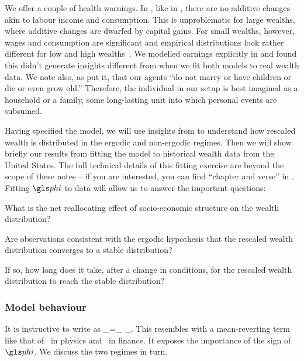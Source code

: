 We offer a couple of health warnings. In \RGBM, like in \GBM, there are no additive changes akin to labour income and consumption. This is unproblematic for large wealths, where additive changes are dwarfed by capital gains. For small wealths, however, wages and consumption are significant and empirical distributions look rather different for low and high wealths~\cite{DragulescuYakovenko2001}. We modelled earnings explicitly in \cite{BermanPetersAdamou2017} and found this didn't generate insights different from \RGBM when we fit both models to real wealth data. We note also, as \cite[p.~41]{meade1964efficiency} put it, that our agents ``do not marry or have children or die or even grow old.'' Therefore, the individual in our setup is best imagined as a household or a family, \ie some long-lasting unit into which personal events are subsumed.

Having specified the model, we will use insights from  to understand how rescaled wealth is distributed in the ergodic and non-ergodic regimes. Then we will show briefly our results from fitting the model to historical wealth data from the United States. The full technical details of this fitting exercise are beyond the scope of these notes -- if you are interested, you can find ``chapter and verse'' in \cite{BermanPetersAdamou2017}. Fitting $\gphi$ to data will allow us to answer the important questions:
\bi
\item
What is the net reallocating effect of socio-economic structure on the wealth distribution?
\item
Are observations consistent with the ergodic hypothesis that the rescaled wealth distribution converges to a stable distribution?
\item
If so, how long does it take, after a change in conditions, for the rescaled wealth distribution to reach the stable distribution?
\ei


\subsubsection{Model behaviour}
It is instructive to write  as
\be
\gd\x_\gi=\underbrace{\x_\gi \left[\gmu \gd\t+\gsigma \gd\gW_\gi\left(\t\right)\right]}_{} \;\; \underbrace{ - \;\; \gphi (\x_\gi-\ave{\x}_\N) \gd\t}_{}.
\ee
This resembles \GBM with a mean-reverting term like that of~\cite{UhlenbeckOrnstein1930} in physics and~\cite{Vasicek1977} in finance. It exposes the importance of the sign of $\gphi$. We discuss the two regimes in turn.

